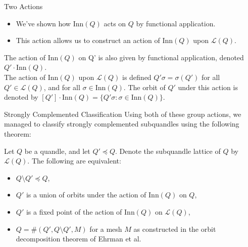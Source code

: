 \documentclass[10pt]{beamer}
\newcommand{\sq}{\preccurlyeq} %
\newcommand{\Inn}{\mathrm{Inn}} %
\theoremstyle{plain}
\begin{document}
\begin{frame}{Two Actions}

\begin{itemize}
    \item We've shown how $\Inn(Q)$ acts on $Q$ by functional application.
    \item This action allows us to construct an action of $\Inn(Q)$ upon $\mathcal{L}(Q)$.
\end{itemize}

\vspace{0.5cm}
\begin{definition}
The action of $\Inn (Q)$ on Q' is also given by functional application, denoted $Q'\cdot \Inn(Q)$. \\
\vspace{0.15in}
The action of $\Inn(Q)$ upon $\mathcal{L}(Q)$ is defined $Q'\sigma = \sigma(Q')$ for all $Q'\in \mathcal{L}(Q)$, and for all $\sigma\in \Inn(Q)$.
The orbit of $Q'$ under this action is denoted by $[Q']\cdot \Inn(Q) = \{ Q'\sigma: \sigma \in \Inn(Q)\}$.\\
\end{definition}
\end{frame}

\begin{frame}{Strongly Complemented Classification}
Using both of these group actions, we managed to classify strongly complemented subquandles using the following theorem:


\begin{theorem}
Let $Q$ be a quandle, and let $Q'\sq Q$. Denote the subquandle lattice of $Q$ by $\mathcal{L}(Q)$. The following are equivalent:
\begin{itemize}
    \item $Q\setminus Q'\sq Q$,
    \item $Q'$ is a union of orbits under the action of $\Inn(Q)$ on $Q$,
    \item $Q'$ is a fixed point of the action of $\Inn(Q)$ on $\mathcal{L}(Q)$,
    \item $Q = \#(Q',Q\setminus Q', M)$ for a mesh $M$ as constructed in the orbit decomposition theorem of Ehrman et al.
\end{itemize}
\end{theorem}

\end{frame}
\end{document}
